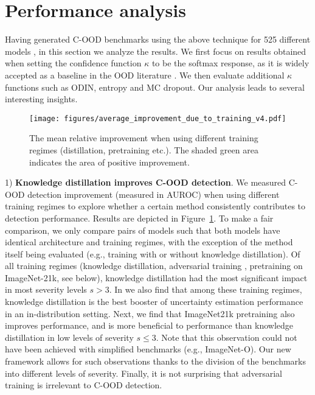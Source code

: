 \documentclass[table]{article} \usepackage{PRIMEarxiv}
\begin{document}
\section{Performance analysis}
\label{sec:analysis}
Having generated C-OOD benchmarks using the above technique for 525 different models
, in this section we analyze the results.
We first focus on results obtained when setting the confidence function $\kappa$ to be the softmax response, as it is widely accepted as a baseline in the OOD literature \citep{DBLP:conf/iclr/HendrycksG17, DBLP:conf/miccai/BergerPGK21}.
 We then evaluate additional $\kappa$ functions such as ODIN, entropy and MC dropout.
Our analysis leads to several interesting insights.

\begin{figure}[h]
    \centering
\texttt{[image: figures/average\_improvement\_due\_to\_training\_v4.pdf]}
    \caption{The mean relative improvement when using different training regimes (distillation, pretraining etc.). The shaded green area indicates the area of positive improvement.}
    \label{fig:relative_imrovement_training}
\end{figure}
1) \textbf{Knowledge distillation improves C-OOD detection}.
We measured C-OOD detection improvement (measured in AUROC) when using different training regimes to explore whether a certain method consistently contributes to detection performance. Results are depicted in Figure~\ref{fig:relative_imrovement_training}.
To make a fair comparison, we only compare pairs of models such that both models have identical architecture and training regimes, with the exception of the method itself being evaluated (e.g., training with or without knowledge distillation). Of all training regimes (knowledge distillation, adversarial training \citep{DBLP:journals/corr/GoodfellowSS14}, pretraining on ImageNet-21k, see below),
knowledge distillation had the most significant impact in most severity levels $s> 3$.
In \citet{galil2023what} we also find that among these training regimes, knowledge distillation is the best booster of uncertainty estimation performance in an in-distribution setting.
Next, we find that ImageNet21k pretraining also improves performance, and is more beneficial to performance than knowledge distillation in low levels of severity $s \leq 3$. 
Note that this observation could not have been achieved with simplified benchmarks (e.g., ImageNet-O). Our new framework allows for such observations thanks to the division of the benchmarks into different levels of severity.
Finally, 
it is not surprising that adversarial training is irrelevant to C-OOD detection.
\end{document}
